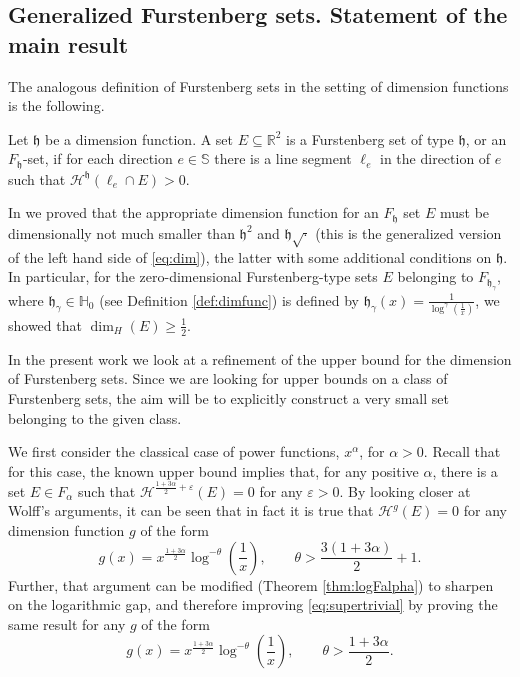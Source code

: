 \documentclass[11pt,a4paper]{amsart}
\begin{document}
\subsection{Generalized Furstenberg sets. Statement of the main result}

The analogous definition of Furstenberg sets in the setting of
dimension functions is the following.
\begin{definition}\label{def:furs}
Let ${\mathfrak{h}}$ be a dimension function. A set $E\subseteq{\mathbb{R}^{2}}$ is a
Furstenberg set of type ${\mathfrak{h}}$, or an $F_{\mathfrak{h}}$-set, if for each
direction $e\in{\mathbb{S}}$ there is a line segment $\ell_e$ in the
direction of $e$ such that  ${\mathcal{H}^{{\mathfrak{h}}}}(\ell_e \cap E)>0$.
\end{definition}

In \cite{mr10} we proved that the appropriate dimension function
for an $F_{\mathfrak{h}}$ set $E$ must be dimensionally not much smaller than ${\mathfrak{h}}^2$
and ${\mathfrak{h}}\sqrt{\cdot}$ (this is the generalized version of the left
hand side of \eqref{eq:dim}), the latter with some additional
conditions on ${\mathfrak{h}}$. 
In particular, for the zero-dimensional Furstenberg-type sets $E$ belonging to $F_{{\mathfrak{h}}_\gamma}$, where
${\mathfrak{h}}_\gamma\in{\mathbb{H}}_0$ (see Definition \ref{def:dimfunc}) is defined by
${\mathfrak{h}}_\gamma(x)=\frac{1}{\log^\gamma(\frac{1}{x})}$, we showed that $\dim_H(E)\ge\frac{1}{2}$.

In the present work we look at a refinement of the upper bound for the dimension of Furstenberg sets. Since we are looking for upper
bounds on a class of Furstenberg sets, the aim will be to explicitly construct  a very small set belonging to the given class.

We first consider the classical case of power functions,  $x^\alpha$, for $\alpha >0$. Recall that for this case, the known upper bound implies that, for any positive
$\alpha$, there is a set $E\in F_\alpha$ such that
${\mathcal{H}^{{\frac{1+3\alpha}{2}+{\varepsilon}}}}(E)=0$ for any ${\varepsilon}>0$. By looking closer at  Wolff's arguments, it can be seen that in fact it is true that ${\mathcal{H}^{{g}}}(E)=0$ for any dimension function $g$ of the form
\begin{equation}\label{eq:supertrivial}
g(x)=x^\frac{1+3\alpha}{2}\log^{-\theta}\left(\frac{1}{x}\right),\qquad \theta>\frac{3(1+3\alpha)}{2}+1.
\end{equation}
Further, that argument can be modified (Theorem \ref{thm:logFalpha}) to sharpen on the logarithmic gap, and therefore improving \eqref{eq:supertrivial} by proving the same result for any $g$ of the form
\begin{equation}\label{eq:mediumtrivial}
g(x)=x^\frac{1+3\alpha}{2}\log^{-\theta}\left(\frac{1}{x}\right),\qquad \theta>\frac{1+3\alpha}{2}.
\end{equation}
\end{document}

